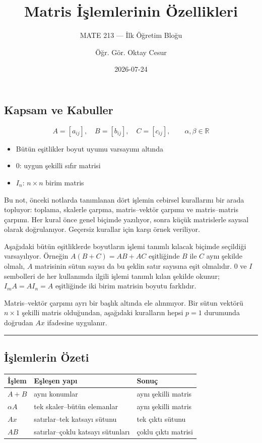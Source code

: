 \documentclass[
  letterpaper,
  DIV=11,
  numbers=noendperiod]{scrartcl}
\title{Matris İşlemlerinin Özellikleri}
\subtitle{MATE 213 --- İlk Öğretim Bloğu}
\author{Öğr. Gör. Oktay Cesur}
\date{2026-07-24}
\providecommand{\tightlist}{%
  \setlength{\itemsep}{0pt}\setlength{\parskip}{0pt}}
\begin{document}
\maketitle


\subsection{Kapsam ve Kabuller}\label{kapsam-ve-kabuller}

\[
A=[a_{ij}],\quad B=[b_{ij}],\quad C=[c_{ij}],
\qquad
\alpha,\beta\in\mathbb{R}
\]

\begin{itemize}
\tightlist
\item
  Bütün eşitlikler boyut uyumu varsayımı altında
\item
  \(0\): uygun şekilli sıfır matrisi
\item
  \(I_n\): \(n\times n\) birim matris
\end{itemize}

Bu not, önceki notlarda tanımlanan dört işlemin cebirsel kurallarını bir
arada topluyor: toplama, skalerle çarpma, matris--vektör çarpımı ve
matris--matris çarpımı. Her kural önce genel biçimde yazılıyor, sonra
küçük matrislerle sayısal olarak doğrulanıyor. Geçersiz kurallar için
karşı örnek veriliyor.

Aşağıdaki bütün eşitliklerde boyutların işlemi tanımlı kılacak biçimde
seçildiği varsayılıyor. Örneğin \(A(B+C)=AB+AC\) eşitliğinde \(B\) ile
\(C\) aynı şekilde olmalı, \(A\) matrisinin sütun sayısı da bu şeklin
satır sayısına eşit olmalıdır. \(0\) ve \(I\) sembolleri de her
kullanımda ilgili işlemi tanımlı kılan şekilde okunur; \(I_mA=AI_n=A\)
eşitliğinde iki birim matrisin boyutu farklıdır.

Matris--vektör çarpımı ayrı bir başlık altında ele alınmıyor. Bir sütun
vektörü \(n\times1\) şekilli matris olduğundan, aşağıdaki kuralların
hepsi \(p=1\) durumunda doğrudan \(Ax\) ifadesine uygulanır.

\begin{center}\rule{0.5\linewidth}{0.5pt}\end{center}

\subsection{İşlemlerin Özeti}\label{iux15flemlerin-uxf6zeti}

\begin{longtable}[]{@{}lll@{}}
\toprule\noalign{}
İşlem & Eşleşen yapı & Sonuç \\
\midrule\noalign{}
\endhead
\bottomrule\noalign{}
\endlastfoot
\(A+B\) & aynı konumlar & aynı şekilli matris \\
\(\alpha A\) & tek skaler--bütün elemanlar & aynı şekilli matris \\
\(Ax\) & satırlar--tek katsayı sütunu & tek çıktı sütunu \\
\(AB\) & satırlar--çoklu katsayı sütunları & çoklu çıktı matrisi \\
\end{longtable}
\end{document}
